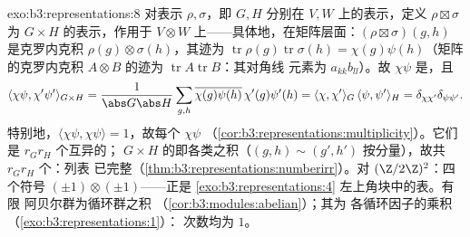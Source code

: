 \begin{solution}{exo:b3:representations:8}
对表示 $\rho, \sigma$，即 $G, H$ 分别在 $V, W$ 上的表示，定义
$\rho \boxtimes \sigma$ 为 $G \times H$ 的表示，作用于
$V \otimes W$ 上——具体地，在矩阵层面：$(\rho\boxtimes
\sigma)(g,h)$ 是克罗内克积 $\rho(g)\otimes
\sigma(h)$，其迹为
$\operatorname{tr}\rho(g)\operatorname{tr}\sigma(h) =
\chi(g)\psi(h)$（矩阵的克罗内克积 $A \otimes B$
的迹为 $\operatorname{tr}A\operatorname{tr}B$：其对角线
元素为 $a_{kk}b_{ll}$）。故 $\chi\psi$ 是，且
\[
\langle\chi\psi, \chi'\psi'\rangle_{G\times H}
= \frac{1}{\abs G\abs H}\sum_{g,h}
\overline{\chi(g)\psi(h)}\,\chi'(g)\psi'(h)
= \langle\chi,\chi'\rangle_G\,\langle\psi,\psi'\rangle_H
= \delta_{\chi\chi'}\delta_{\psi\psi'}.
\]
特别地，$\langle\chi\psi,\chi\psi\rangle = 1$，故每个
$\chi\psi$ 
（\cref{cor:b3:representations:multiplicity}）。它们是
$r_Gr_H$ 个互异的；
$G\times H$ 的即各类之积（$(g,h) \sim (g',h')$
按分量），故共 $r_Gr_H$ 个：列表
已完整（\cref{thm:b3:representations:numberirr}）。对
$(\Z/2\Z)^2$：四个符号
$(\pm1)\otimes(\pm1)$——正是
\cref{exo:b3:representations:4} 左上角块中的表。有限
阿贝尔群为循环群之积
（\cref{cor:b3:modules:abelian}）；其为
各循环因子的乘积（\cref{exo:b3:representations:1}）：
次数均为 $1$。
\end{solution}

